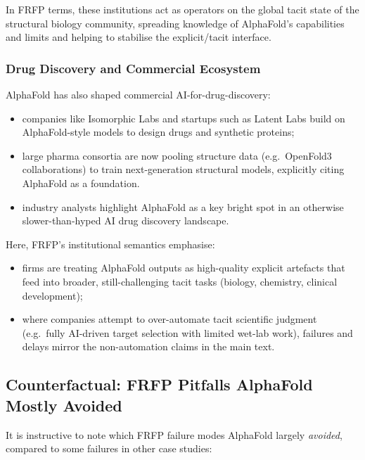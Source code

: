 In FRFP terms, these institutions act as operators on the global tacit state
of the structural biology community, spreading knowledge of AlphaFold’s
capabilities and limits and helping to stabilise the explicit/tacit interface.

\subsubsection*{Drug Discovery and Commercial Ecosystem}

AlphaFold has also shaped commercial AI-for-drug-discovery:

\begin{itemize}
  \item companies like Isomorphic Labs and startups such as Latent Labs build
        on AlphaFold-style models to design drugs and synthetic proteins;
  \item large pharma consortia are now pooling structure data (e.g.\
        OpenFold3 collaborations) to train next-generation structural models,
        explicitly citing AlphaFold as a foundation.
  \item industry analysts highlight AlphaFold as a key bright spot in an
        otherwise slower-than-hyped AI drug discovery landscape.
\end{itemize}

Here, FRFP’s institutional semantics emphasise:

\begin{itemize}
  \item firms are treating AlphaFold outputs as high-quality explicit
        artefacts that feed into broader, still-challenging tacit tasks
        (biology, chemistry, clinical development);
  \item where companies attempt to over-automate tacit scientific judgment
        (e.g.\ fully AI-driven target selection with limited wet-lab work),
        failures and delays mirror the non-automation claims in the main text.
\end{itemize}

\subsection{Counterfactual: FRFP Pitfalls AlphaFold Mostly Avoided}

It is instructive to note which FRFP failure modes AlphaFold largely
\emph{avoided}, compared to some failures in other case studies:

